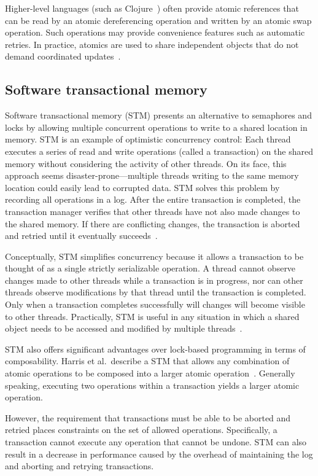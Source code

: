\documentclass{sig-alternate}
\begin{document}
Higher-level languages (such as Clojure~\cite{Swalens2014}) often provide atomic references that can be read by an atomic dereferencing operation and written by an atomic swap operation. Such operations may provide convenience features such as automatic retries. In practice, atomics are used to share independent objects that do not demand coordinated updates~\cite{Swalens2014}.

\subsection{Software transactional memory}

Software transactional memory (STM) presents an alternative to semaphores and locks by allowing multiple concurrent operations to write to a shared location in memory. STM is an example of optimistic concurrency control: Each thread executes a series of read and write operations (called a transaction) on the shared memory without considering the activity of other threads. On its face, this approach seems disaster-prone---multiple threads writing to the same memory location could easily lead to corrupted data. STM solves this problem by recording all operations in a log. After the entire transaction is completed, the transaction manager verifies that other threads have not also made changes to the shared memory. If there are conflicting changes, the transaction is aborted and retried until it eventually succeeds~\cite{Shavit1995}.

Conceptually, STM simplifies concurrency because it allows a transaction to be thought of as a single strictly serializable operation. A thread cannot observe changes made to other threads while a transaction is in progress, nor can other threads observe modifications by that thread until the transaction is completed. Only when a transaction completes successfully will changes will become visible to other threads. Practically, STM is useful in any situation in which a shared object needs to be accessed and modified by multiple threads~\cite{Swalens2014}.

STM also offers significant advantages over lock-based programming in terms of composability. Harris et al.\ describe a STM that allows any combination of atomic operations to be composed into a larger atomic operation~\cite{Harris2005}. Generally speaking, executing two operations within a transaction yields a larger atomic operation.

However, the requirement that transactions must be able to be aborted and retried places constraints on the set of allowed operations. Specifically, a transaction cannot execute any operation that cannot be undone. STM can also result in a decrease in performance caused by the overhead of maintaining the log and aborting and retrying transactions.
\end{document}
